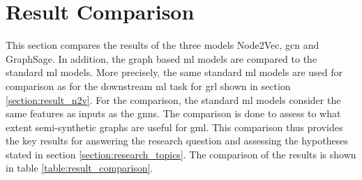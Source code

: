   \section{Result Comparison}
  \label{section:result_comp}

  This section compares the results of the three models Node2Vec, \acs{gcn} and
  GraphSage. In addition, the graph based \acs{ml} models are compared to the 
  standard \acs{ml} models. More precisely, the same standard \acs{ml} models 
  are used for comparison as for the downstream \acs{ml} task for \acs{grl} 
  shown in section \ref{section:result_n2v}. For the comparison, the standard 
  \acs{ml} models consider the same features as inputs as the \acsp{gnn}. The 
  comparison is done to assess to what extent semi-synthetic graphs are useful 
  for \acs{gml}. This comparison thus provides the key results for answering
  the research question and assessing the hypotheses stated in section 
  \ref{section:research_topics}. The comparison of the results is shown in table 
  \ref{table:result_comparison}.

  \begin{table}[h]
    \centering
    \caption{Result Comparison}
    \label{table:result_comparison}
  \end{table}

